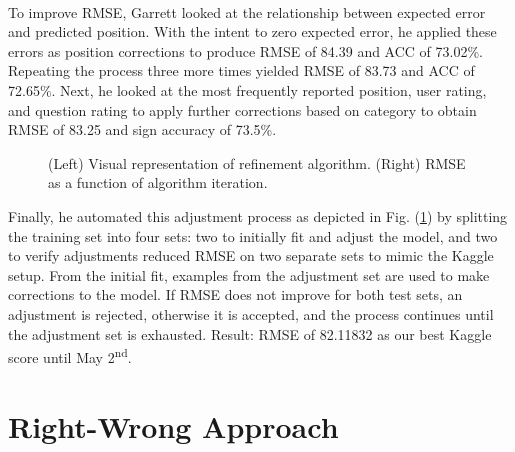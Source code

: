 \documentclass[letterpaper]{article}
\begin{document}
\paragraph{} To improve RMSE, Garrett looked at the relationship between expected error and predicted position. With the intent to zero expected error, he applied these errors as position corrections to produce RMSE of 84.39 and ACC of 73.02\%. Repeating the process three more times yielded RMSE of 83.73 and ACC of 72.65\%. Next, he looked at the most frequently reported position, user rating, and question rating to apply further corrections based on category to obtain RMSE of 83.25 and sign accuracy of 73.5\%.

\begin{figure}[H]
	\begin{center}
	\end{center}
	\caption{(Left) Visual representation of refinement algorithm. (Right) RMSE as a function of algorithm iteration.}
	\label{fig:expectedValue:refinement}
\end{figure}

Finally, he automated this adjustment process as depicted in Fig. (\ref{fig:expectedValue:refinement}) by splitting the training set into four sets: two to initially fit and adjust the model, and two to verify adjustments reduced RMSE on two separate sets to mimic the Kaggle setup. From the initial fit, examples from the adjustment set are used to make corrections to the model. If RMSE does not improve for both test sets, an adjustment is rejected, otherwise it is accepted, and the process continues until the adjustment set is exhausted. Result: RMSE of 82.11832 as our best Kaggle score until May 2\textsuperscript{nd}.

\section{Right-Wrong Approach}
\end{document}
